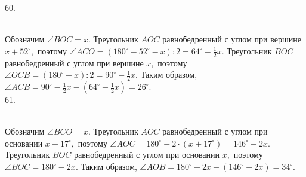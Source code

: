 \documentclass[12pt]{article}
\begin{document}
60. \begin{figure}[ht!]
\end{figure}\\
Обозначим $\angle BOC=x.$ Треугольник $AOC$ равнобедренный с углом при вершине $x+52^\circ,$ поэтому $\angle ACO=(180^\circ-52^\circ-x):2=64^\circ-\frac{1}{2}x.$ Треугольник $BOC$ равнобедренный с углом при вершине $x,$ поэтому $\angle OCB=(180^\circ-x):2=90^\circ-\frac{1}{2}x.$ Таким образом, $\angle ACB=90^\circ-\frac{1}{2}x-(64^\circ-\frac{1}{2}x)=26^\circ.$\\
61. \begin{figure}[ht!]
\end{figure}\\
Обозначим $\angle BCO=x.$ Треугольник $AOC$ равнобедренный с углом при основании $x+17^\circ,$ поэтому $\angle AOC=180^\circ-2\cdot(x+17^\circ)=146^\circ-2x.$ Треугольник $BOC$ равнобедренный с углом при основании $x,$ поэтому $\angle BOC=180^\circ-2x.$ Таким образом, $\angle AOB=180^\circ-2x-(146^\circ-2x)=34^\circ.$\\
\end{document}
